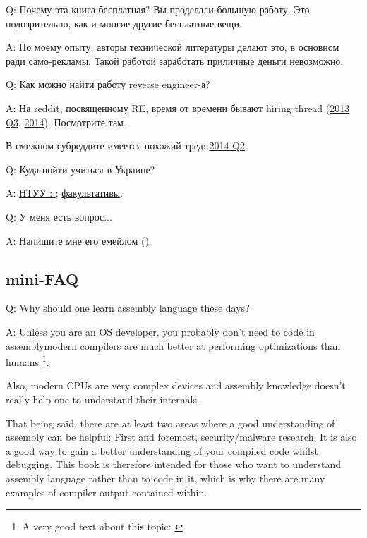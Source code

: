 \par Q: Почему эта книга бесплатная? Вы проделали большую работу. Это подозрительно, как и многие другие бесплатные вещи.
\par A: По моему опыту, авторы технической литературы делают это, в основном ради само-рекламы. Такой работой заработать приличные деньги невозможно.

\par Q: Как можно найти работу reverse engineer-а?
\par A: На reddit, посвященному RE\FNURLREDDIT, время от времени бывают hiring thread (\href{http://go.yurichev.com/17333}{2013 Q3}, \href{http://go.yurichev.com/17334}{2014}).
Посмотрите там.

В смежном субреддите  имеется похожий тред: \href{http://go.yurichev.com/17335}{2014 Q2}.

\par Q: Куда пойти учиться в Украине?
\par A: \href{http://go.yurichev.com/17336}{НТУУ : };
\href{http://go.yurichev.com/17337}{факультативы}.

\par Q: У меня есть вопрос...
\par A: Напишите мне его емейлом (\EMAIL).
\fi %

\ifdefined\ENGLISH
\subsection*{mini-FAQ}

\par Q: Why should one learn assembly language these days?
\par A: Unless you are an \ac{OS} developer, you probably don't need to code in assembly\textemdash{}modern compilers 
are much better at performing optimizations than humans \footnote{A very good text about this topic: \cite{AgnerFog}}.

Also, modern \ac{CPU}s are very complex devices and assembly knowledge doesn't really help one to understand their internals.

That being said, there are at least two areas where a good understanding of assembly can be helpful: 
First and foremost, security/malware research. It is also a good way to gain a better understanding of your compiled code whilst debugging.
This book is therefore intended for those who want to understand assembly language rather 
than to code in it, which is why there are many examples of compiler output contained within.

